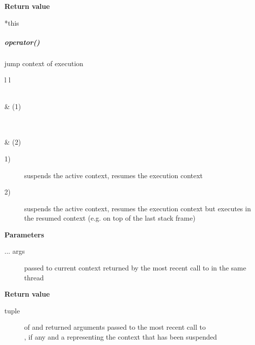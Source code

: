 {\bfseries Return value}
\begin{description}
    \item[*this]
\end{description}

\subparagraph*{operator()}
jump context of execution\\

\begin{tabular}{ l l }
    \midrule

    \\
     & (1)\\

    \midrule

    \\
    \\
     & (2)\\

    \midrule
\end{tabular}

\begin{description}
    \item[1)] suspends the active context, resumes the execution context
    \item[2)] suspends the active context, resumes the execution context but
        executes  in the resumed context (e.g. on top of the
        last stack frame)
\end{description}

{\bfseries Parameters}
\begin{description}
    \item[... args] passed to current context  returned by the most recent call
                    to  in the same thread\\
\end{description}

{\bfseries Return value}
\begin{description}
    \item[tuple]    of  and returned arguments passed to
                    the most recent call to\\ ,
                    if any and a  representing the
                    context that has been suspended\\
\end{description}

